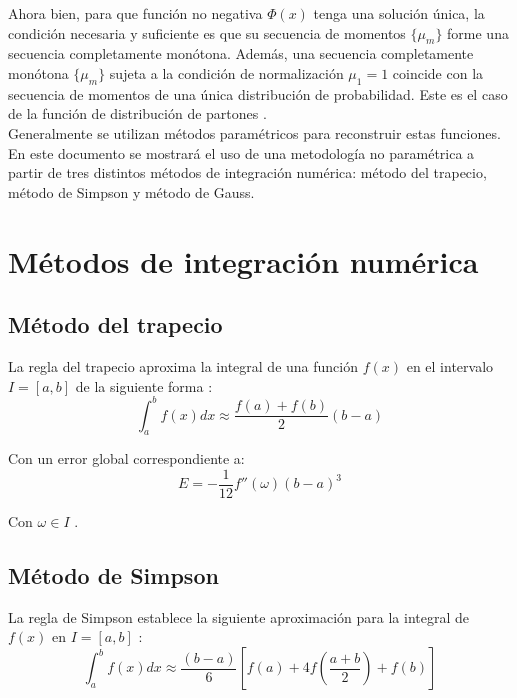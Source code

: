 \documentclass[titlepage,11pt]{report}
\begin{document}
Ahora bien, para que función no negativa $\Phi(x)$ tenga una solución única, la condición necesaria y suficiente es que su secuencia de momentos $\{\mu_{m}\}$ forme una secuencia completamente monótona. Además, una secuencia completamente monótona $\{\mu_m\}$ sujeta a la condición de normalización $\mu_1=1$ coincide con la secuencia de momentos de una única distribución de probabilidad. Este es el caso de la función de distribución de partones \cite{gzyl2010hausdorff}. \\

Generalmente se utilizan métodos paramétricos para reconstruir estas funciones. En este documento se mostrará el uso de una metodología no paramétrica a partir de tres distintos métodos de integración numérica: método del trapecio, método de Simpson y método de Gauss.

\section{Métodos de integración numérica}

\subsection{Método del trapecio}

La regla del trapecio aproxima la integral de una función $f(x)$ en el intervalo $I=[a,b]$ de la siguiente forma \cite{davis2007methods}:
\begin{equation*}
    \int_{a}^{b}f(x)dx\approx \frac{f(a)+f(b)}{2}(b-a)
\end{equation*}

Con un error global correspondiente a:
\begin{equation*}
    E=-\frac{1}{12}f''(\omega)(b-a)^3
\end{equation*}

Con $\omega\in I$ \cite{larson2005cálculo}.

\subsection{Método de Simpson}

La regla de Simpson establece la siguiente aproximación para la integral de $f(x)$ en $I=[a,b]$ \cite{davis2007methods}:
\begin{equation*}
    \int_{a}^{b}f(x)dx\approx \frac{(b-a)}{6}\left[f(a)+4f\left(\frac{a+b}{2}\right)+f(b)\right]
\end{equation*}
\end{document}
